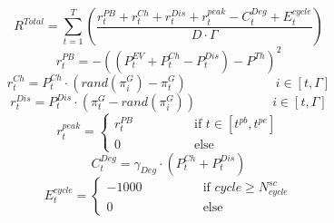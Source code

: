 \documentclass[10pt, journal]{IEEEtran}
\begin{document}
\vspace{-5mm}
{\small
\begin{equation}
\label{eq:Total_r}
R^{Total} = \sum_{t=1}^{T} \left( \frac{r_t^{PB} + r_t^{Ch} + r_t^{Dis} + r_t^{peak} - C_t^{Deg} + E_t^{cycle}}{D \cdot \Gamma} \right)
\end{equation}
\vspace{-3mm}
\begin{equation}
\label{eq:r_pb}
r_t^{PB} = - ((P_t^{EV} + P_t^{Ch} - P_t^{Dis}) - P^{Th}) ^2
\end{equation}
\vspace{-3mm}
\begin{equation}
\label{eq:r_ch}
r_t^{Ch} = P_t^{Ch} \cdot ( {rand}(\pi^G_i) - \pi^G_t ) \quad \quad \quad \quad \quad \quad \quad i \in [t, \Gamma]
\end{equation}
\begin{equation}
\label{eq:r_dis}
r_t^{Dis} = P_t^{Dis} \cdot ( \pi^G_t - {rand}(\pi^G_i) ) \quad \quad \quad \quad \quad \quad i \in [t, \Gamma]
\end{equation}
\begin{equation}
\label{eq:r_peak}
r_t^{peak} = 
\begin{cases} 
      r_t^{PB} & \quad \quad \quad \quad \text{if } t \in \left[ t^{pb}, t^{pe} \right] \\
      0 & \quad \quad \quad \quad \text{else}
\end{cases}
\end{equation}
\begin{equation}
\label{eq:r_deg}
C_t^{Deg} = \gamma_{Deg} \cdot ( P_t^{Ch} + P_t^{Dis} )
\end{equation}
\begin{equation}
\label{eq:E_cycle}
E_t^{cycle} = 
\begin{cases} 
      -1000 & \quad \quad \quad \quad \text{if } cycle \geq N^{sc}_{cycle} \\
      0 & \quad \quad \quad \quad \text{else}
\end{cases}
\end{equation}}

\vspace{-5mm}
\end{document}

